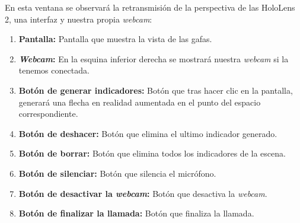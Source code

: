 En esta ventana se observará la retransmisión de la perspectiva de las HoloLens 2, una interfaz y nuestra propia \textit{webcam}: 
\begin{enumerate}
    \item \textbf{Pantalla:} Pantalla que muestra la vista de las gafas.
    \item \textbf{\textit{Webcam}:} En la esquina inferior derecha se mostrará nuestra \textit{webcam} si la tenemos conectada.
    \item \textbf{Botón de generar indicadores:} Botón que tras hacer clic en la pantalla, generará una flecha en realidad aumentada en el punto del espacio correspondiente.
    \item \textbf{Botón de deshacer:} Botón que elimina el ultimo indicador generado.
    \item \textbf{Botón de borrar:} Botón que elimina todos los indicadores de la escena.
    \item \textbf{Botón de silenciar:} Botón que silencia el micrófono.
    \item \textbf{Botón de desactivar la \textit{webcam}:} Botón que desactiva la \textit{webcam}.
    \item \textbf{Botón de finalizar la llamada:} Botón que finaliza la llamada.
\end{enumerate}

